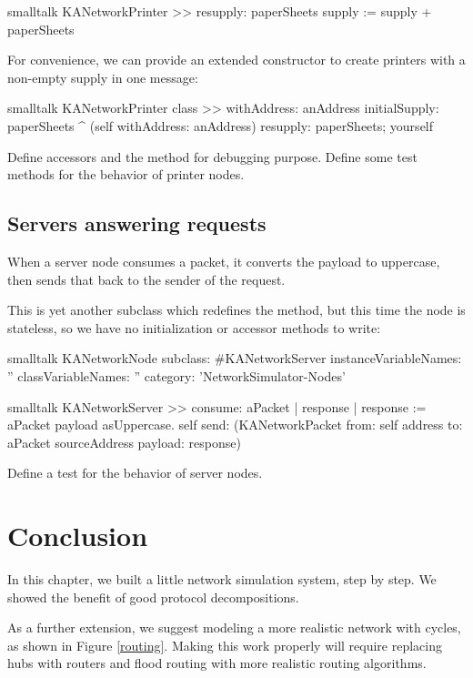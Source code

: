 \documentclass[10pt,twoside,english]{_support/latex/sbabook/sbabook}
\begin{document}
\begin{displaycode}{smalltalk}
KANetworkPrinter >> resupply: paperSheets
    supply := supply + paperSheets
\end{displaycode}

For convenience, we can provide an extended constructor to create printers with a non-empty supply in one message:

\begin{displaycode}{smalltalk}
KANetworkPrinter class >> withAddress: anAddress initialSupply: paperSheets
    ^ (self withAddress: anAddress)
        resupply: paperSheets;
        yourself
\end{displaycode}

Define accessors and the  method for debugging purpose. 
Define some test methods for the behavior of printer nodes.
\subsection{Servers answering requests}
When a server node consumes a packet, it converts the payload to uppercase, then sends that back to the sender of the request.

This is yet another subclass which redefines the  method, but this time the node is stateless, so we have no initialization or accessor methods to write:

\begin{displaycode}{smalltalk}
KANetworkNode subclass: #KANetworkServer
    instanceVariableNames: ''
    classVariableNames: ''
    category: 'NetworkSimulator-Nodes'
\end{displaycode}

\begin{displaycode}{smalltalk}
KANetworkServer >> consume: aPacket
    | response |
    response := aPacket payload asUppercase.
    self send: (KANetworkPacket
        from: self address
        to: aPacket sourceAddress
        payload: response)
\end{displaycode}

Define a test for the behavior of server nodes.
\section{Conclusion}
In this chapter, we built a little network simulation system, step by step.
We showed the benefit of good protocol decompositions.

As a further extension, we suggest modeling a more realistic network with cycles, as shown in Figure \ref{routing}.
Making this work properly will require replacing hubs with routers and flood routing with more realistic routing algorithms.
\end{document}
